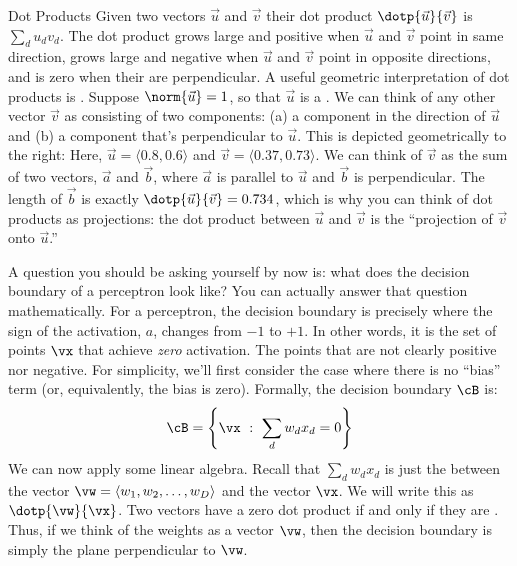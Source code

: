 \begin{mathreview}{Dot Products}
  Given two vectors $\vec u$ and $\vec v$ their dot product $\dotp{\vec u}{\vec v}$ is $\sum_d u_d v_d$.
  The dot product grows large and positive when $\vec u$ and $\vec v$ point in same direction, grows
  large and negative when $\vec u$ and $\vec v$ point in opposite directions, and is zero when their are perpendicular.
  A useful geometric interpretation of dot products is .
  Suppose $\norm{\vec u} = 1$, so that $\vec u$ is a .
  We can think of any other vector $\vec v$ as consisting of two components: (a) a component in the direction of $\vec u$ and (b) a component that's perpendicular to $\vec u$.
  This is depicted geometrically to the right:
  Here, $\vec u = \langle 0.8, 0.6 \rangle$ and $\vec v = \langle 0.37, 0.73 \rangle$.
  We can think of $\vec v$ as the sum of two vectors, $\vec a$ and $\vec b$, where
  $\vec a$ is parallel to $\vec u$ and $\vec b$ is perpendicular.
  The length of $\vec b$ is exactly $\dotp{\vec u}{\vec v} = 0.734$, which is why you can think of
  dot products as projections: the dot product between $\vec u$ and $\vec v$ is the ``projection of $\vec v$ onto $\vec u$.''
\end{mathreview}

A question you should be asking yourself by now is: what does the
decision boundary of a perceptron look like?  You can actually answer
that question mathematically.  For a perceptron, the decision boundary
is precisely where the sign of the activation, $a$, changes from $-1$
to $+1$.  In other words, it is the set of points $\vx$ that achieve
\emph{zero} activation.  The points that are not clearly positive nor
negative.  For simplicity, we'll first consider the case where there
is no ``bias'' term (or, equivalently, the bias is zero).  Formally,
the decision boundary $\cB$ is:
\begin{equation}
\cB = \left\{ \vx ~:~ \sum_d w_d x_d = 0 \right\}
\end{equation}
We can now apply some linear algebra.  Recall that $\sum_d w_d x_d$ is
just the  between the vector $\vw = \langle w_1,
w_2, \dots, w_D \rangle$ and the vector $\vx$.  We will write this as
$\dotp{\vw}{\vx}$.  Two vectors have a zero dot product if and only if
they are .  Thus, if we think of the weights as
a vector $\vw$, then the decision boundary is simply the plane
perpendicular to $\vw$.

